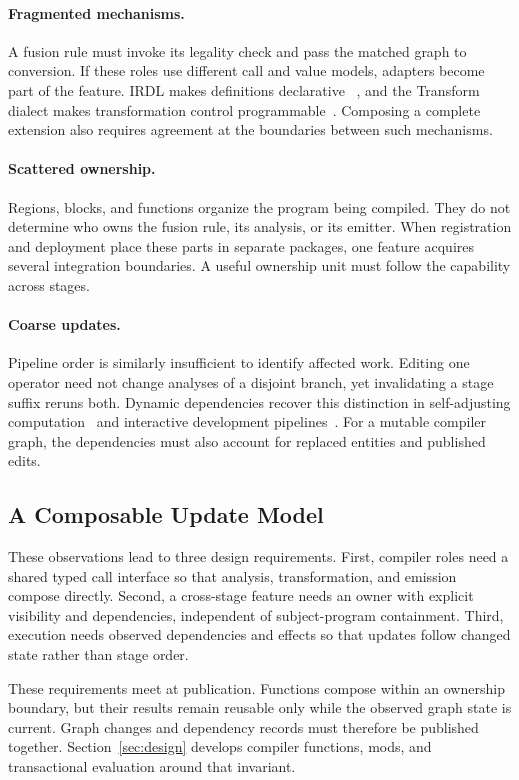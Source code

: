 \paragraph{Fragmented mechanisms.} A fusion rule must invoke its legality check and pass
the matched graph to conversion. If these roles use different call and value
models, adapters become part of the feature. IRDL makes definitions declarative
~\cite{fehr2022irdl}, and the Transform dialect makes transformation control
programmable~\cite{lucke2025transform}. Composing a complete extension also requires
agreement at the boundaries between such mechanisms.

\paragraph{Scattered ownership.} Regions, blocks, and functions organize the program
being compiled. They do not determine who owns the fusion rule, its analysis,
or its emitter. When registration and deployment place these parts in separate
packages, one feature acquires several integration boundaries. A useful
ownership unit must follow the capability across stages.

\paragraph{Coarse updates.} Pipeline order is similarly insufficient to identify affected
work. Editing one operator need not change analyses of a disjoint branch, yet
invalidating a stage suffix reruns both. Dynamic dependencies recover this
distinction in self-adjusting computation~\cite{acar2009selfadjusting} and
interactive development pipelines~\cite{konat2018pie}. For a mutable compiler graph,
the dependencies must also account for replaced entities and published edits.

\subsection{A Composable Update Model}
\label{sec:requirements}

These observations lead to three design requirements. First, compiler roles
need a shared typed call interface so that analysis, transformation, and
emission compose directly. Second, a cross-stage feature needs an owner with
explicit visibility and dependencies, independent of subject-program
containment. Third, execution needs observed dependencies and effects so that
updates follow changed state rather than stage order.

These requirements meet at publication. Functions compose within an ownership
boundary, but their results remain reusable only while the observed graph state
is current. Graph changes and dependency records must therefore be published together. Section~\ref{sec:design} develops compiler
functions, mods, and transactional evaluation around that invariant.
